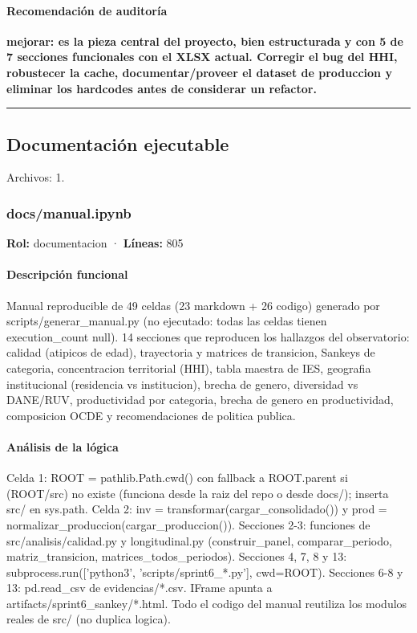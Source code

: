 \paragraph{Recomendación de auditoría}
\textbf{mejorar: es la pieza central del proyecto, bien estructurada y con 5 de 7 secciones funcionales con el XLSX actual. Corregir el bug del HHI, robustecer la cache, documentar/proveer el dataset de produccion y eliminar los hardcodes antes de considerar un refactor.}

\medskip
\hrule

\subsection{Documentación ejecutable}
\noindent Archivos: 1.

\subsubsection{docs/manual.ipynb}
\textbf{Rol:} documentacion · \textbf{Líneas:} 805

\paragraph{Descripción funcional}
Manual reproducible de 49 celdas (23 markdown + 26 codigo) generado por scripts/generar\_manual.py (no ejecutado: todas las celdas tienen execution\_count null). 14 secciones que reproducen los hallazgos del observatorio: calidad (atipicos de edad), trayectoria y matrices de transicion, Sankeys de categoria, concentracion territorial (HHI), tabla maestra de IES, geografia institucional (residencia vs institucion), brecha de genero, diversidad vs DANE/RUV, productividad por categoria, brecha de genero en productividad, composicion OCDE y recomendaciones de politica publica.

\paragraph{Análisis de la lógica}
Celda 1: ROOT = pathlib.Path.cwd() con fallback a ROOT.parent si (ROOT/src) no existe (funciona desde la raiz del repo o desde docs/); inserta src/ en sys.path. Celda 2: inv = transformar(cargar\_consolidado()) y prod = normalizar\_produccion(cargar\_produccion()). Secciones 2-3: funciones de src/analisis/calidad.py y longitudinal.py (construir\_panel, comparar\_periodo, matriz\_transicion, matrices\_todos\_periodos). Secciones 4, 7, 8 y 13: subprocess.run(['python3', 'scripts/sprint6\_*.py'], cwd=ROOT). Secciones 6-8 y 13: pd.read\_csv de evidencias/*.csv. IFrame apunta a artifacts/sprint6\_sankey/*.html. Todo el codigo del manual reutiliza los modulos reales de src/ (no duplica logica).


